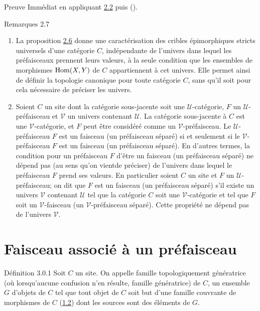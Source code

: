 \documentclass[10pt]{../fichiers-configuration-latex/smfart}
\begin{document}
\begin{enonce*}[remark]{Preuve}
Immédiat en appliquant \hyperref[II.prop2.2]{2.2} puis ().
\end{enonce*}

\begin{enonce*}[remark]{Remarques 2.7}
\begin{enumerate}
\renewcommand{\labelenumi}{\theenumi)}
\item La proposition \hyperref[II.prop2.6]{2.6} donne une caractérisation des cribles
  épimorphiques stricts universels d'une catégorie $C$,
  indépendante de l'univers dans lequel les préfaisceaux prennent
  leurs valeurs, à la seule condition que les ensembles de
  morphismes $\operatorname{Hom}(X,Y)$ de $C$ appartiennent à cet univers. Elle
  permet ainsi de définir la topologie canonique pour toute
  catégorie $C$, sans qu'il soit pour cela nécessaire de
  préciser les univers.

\item Soient $C$ un site dont la catégorie sous-jacente soit une
  $𝒰$-catégorie, $F$ un $𝒰$-préfaisceau et
  $𝒱$ un univers contenant $𝒰$. La catégorie
  sous-jacente à $C$ est une $𝒱$-catégorie, et $F$ peut
  être considéré comme un $𝒱$-préfaisceau. Le
  $𝒰$-préfaisceau $F$ est un faisceau (\resp un
  préfaisceau séparé) si et seulement si le
  $𝒱$-préfaisceau $F$ est un faisceau (\resp un
  préfaisceau séparé). En d'autres termes, la condition pour un
  préfaisceau $F$ d'être un faisceau (\resp un préfaisceau
  séparé) ne dépend pas (au sens qu'on vient\pageoriginale de
  préciser) de l'univers dans lequel le préfaisceau $F$ prend ses
  valeurs. En particulier soient $C$ un site et $F$ un
  $𝒰$-préfaisceau; on dit que $F$ est un faisceau (\resp un
  préfaisceau séparé) s'il existe un univers $𝒱$
  contenant $𝒰$ tel que la catégorie $C$ soit une
  $𝒱$-catégorie et tel que $F$ soit un $𝒱$-faisceau
  (\resp un $𝒱$-préfaisceau séparé). Cette propriété
  ne dépend pas de l'univers $𝒱$.
\end{enumerate}
\end{enonce*}

\section{Faisceau associé à un préfaisceau}

\begin{enonce*}{Définition 3.0.1}
Soit $C$ un site. On appelle famille topologiquement génératrice
(où lorsqu'aucune confusion n'en résulte, famille
génératrice) de $C$, un ensemble $G$ d'objets de $C$ tel que
tout objet de $C$ soit but d'une famille couvrante de morphismes de
$C$ (\hyperref[II.def1.2]{1.2}) dont les sources sont des éléments de $G$.
\end{enonce*}
\end{document}
